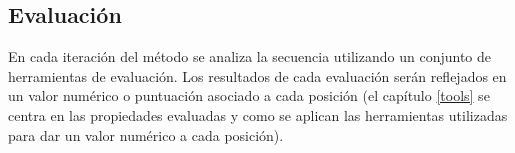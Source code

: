 







\subsection{Evaluación}



En cada iteración del método se analiza la secuencia utilizando un conjunto de herramientas de evaluación.
Los resultados de cada evaluación serán reflejados en un valor numérico o puntuación asociado a cada posición
(el capítulo \ref{tools} se centra en las propiedades evaluadas y como se aplican las herramientas utilizadas para dar un valor numérico a cada posición). 

